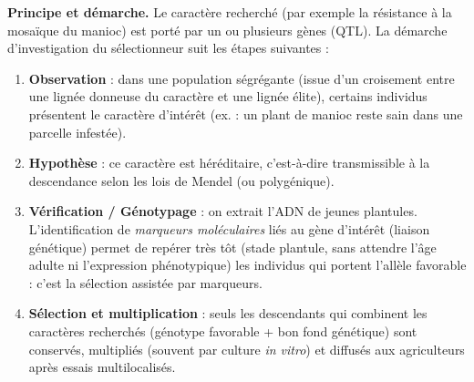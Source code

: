 \documentclass[11pt]{article}
\newcommand{\cle}[1]{{\popxbold\color{popdark}#1}}
\begin{document}
\textbf{Principe et démarche.} Le caractère recherché (par exemple la résistance à la mosaïque du manioc) est porté par un ou plusieurs gènes (QTL). La démarche d'investigation du sélectionneur suit les étapes suivantes :

\begin{enumerate}
\item \textbf{Observation} : dans une population ségrégante (issue d'un croisement entre une lignée donneuse du caractère et une lignée élite), certains individus présentent le caractère d'intérêt (ex. : un plant de manioc reste sain dans une parcelle infestée).
\item \textbf{Hypothèse} : ce caractère est héréditaire, c'est-à-dire transmissible à la descendance selon les lois de Mendel (ou polygénique).
\item \textbf{Vérification / Génotypage} : on extrait l'ADN de jeunes plantules. L'identification de \emph{marqueurs moléculaires} liés au gène d'intérêt (liaison génétique) permet de repérer très tôt (stade plantule, sans attendre l'âge adulte ni l'expression phénotypique) les individus qui portent l'allèle favorable : c'est la \cle{sélection assistée par marqueurs}.
\item \textbf{Sélection et multiplication} : seuls les descendants qui combinent les caractères recherchés (génotype favorable + bon fond génétique) sont conservés, multipliés (souvent par culture \emph{in vitro}) et diffusés aux agriculteurs après essais multilocalisés.
\end{enumerate}
\end{document}
